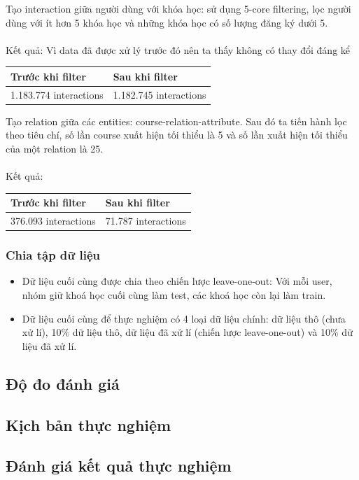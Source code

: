 Tạo interaction giữa người dùng với khóa học: sử dụng 5-core filtering, lọc người dùng với ít hơn 5 khóa học và những khóa học có số lượng đăng ký dưới 5.\\
\\
Kết quả: Vì data đã được xử lý trước đó nên ta thấy không có thay đổi đáng kể
\begin{center}
\begin{tabular}{|| m{15em}  m{15em}||} 
 \hline
 Trước khi filter & Sau khi filter\\ [0.5ex] 
 \hline\hline
 1.183.774 interactions & 1.182.745 interactions \\ [1ex]
 \hline
\end{tabular}
\end{center}
\newpage
Tạo relation giữa các entities: course-relation-attribute. Sau đó ta tiến hành lọc theo tiêu chí, số lần course xuất hiện tối thiểu là 5 và số lần xuất hiện tối thiểu của một relation là 25. \\
\\
Kết quả: 
\begin{center}
\begin{tabular}{|| m{15em}  m{15em}||} 
 \hline
 Trước khi filter & Sau khi filter\\ [0.5ex] 
 \hline\hline
 376.093 interactions & 71.787 interactions \\ [1ex]
 \hline
\end{tabular}
\end{center}
\subsubsection{Chia tập dữ liệu}
\begin{itemize}
    \item Dữ liệu cuối cùng được chia theo chiến lược leave-one-out: Với mỗi user, nhóm giữ khoá học cuối cùng làm test, các khoá học còn lại làm train. 
    \item Dữ liệu cuối cùng để thực nghiệm có 4 loại dữ liệu chính: dữ liệu thô (chưa xử lí), 10\% dữ liệu thô, dữ liệu đã xử lí (chiến lược leave-one-out) và 10\% dữ liệu đã xử lí.
\end{itemize}

\subsection{Độ đo đánh giá}
\subsection{Kịch bản thực nghiệm}
\subsection{Đánh giá kết quả thực nghiệm}
